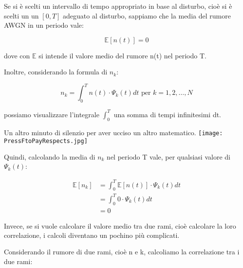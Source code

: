 Se si è scelti un intervallo di tempo appropriato in base al disturbo, 
cioè si è scelti un un $[0, T]$ adeguato al disturbo, sappiamo che la media del rumore AWGN in un periodo vale: 

{
    \Large 
    \begin{equation}
        \mathbb{E} [n(t)]  = 0
    \end{equation}
}

dove con $\mathbb{E}$ si intende il valore medio del rumore n(t) nel periodo T. \newline 

Inoltre, considerando la formula di $n_k$: 

{
    \Large 
    \begin{equation}
        n_{k} 
        =
        \int_{0}^{T}
        n (t)
        \cdot 
        \Psi_k (t)
        dt 
        \text{ per } k = 1, 2, \dots, N
    \end{equation}
}

possiamo visualizzare l'integrale $\int_{0}^{T}$ una somma di tempi infinitesimi dt. \newline 

\begin{tcolorbox}
    Un altro minuto di silenzio per aver ucciso un altro matematico. \newline
    \texttt{[image: PressFtoPayRespects.jpg]}
\end{tcolorbox}

Quindi, calcolando la media di $n_k$ nel periodo T vale, 
per qualsiasi valore di $\Psi_k (t)$: 

{
    \Large 
    \begin{equation}
        \begin{split}
        \mathbb{E} [n_k]
        &= 
        \int_{0}^{T}
        \mathbb{E} [n(t)] \cdot \Psi_k (t) dt 
        \\
        &= 
        \int_{0}^{T}
        0 \cdot \Psi_k (t) dt 
        \\
        &= 
        0
        \end{split}
    \end{equation}
}

Invece, se si vuole calcolare il valore medio tra due rami, cioè calcolare la loro correlazione, 
i calcoli diventano un pochino più complicati. \newline 

Considerando il rumore di due rami, cioè n e k, 
calcoliamo la correlazione tra i due rami: 

